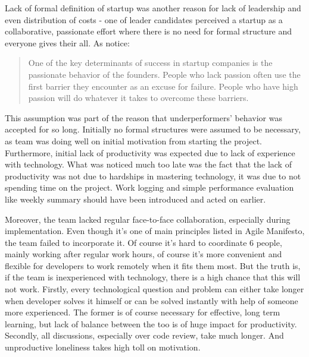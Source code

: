 \documentclass{article}
\begin{document}
Lack of formal definition of startup \citep{paternoster2014software} was another reason for lack of leadership and even distribution of costs - one of leader candidates perceived a startup as a collaborative, passionate effort where there is no need for formal structure and everyone gives their all. As \cite{giardino2014early} notice:
\begin{quote}
  One of the key determinants of success in startup companies is the passionate behavior of the founders. People who lack passion often use the first barrier they encounter as an excuse for failure. People who have high passion will do whatever it takes to overcome these barriers.
\end{quote}

This assumption was part of the reason that underperformers' behavior was accepted for so long. Initially no formal structures were assumed to be necessary, as team was doing well on initial motivation from starting the project. Furthermore, initial lack of productivity was expected due to lack of experience with technology. What was noticed much too late was the fact that the lack of productivity was not due to hardships in mastering technology, it was due to not spending time on the project. Work logging and simple performance evaluation like weekly summary should have been introduced and acted on earlier.

Moreover, the team lacked regular face-to-face collaboration, especially during implementation. Even though it's one of main principles listed in Agile Manifesto, the team failed to incorporate it. Of course it's hard to coordinate 6 people, mainly working after regular work hours, of course it's more convenient and flexible for developers to work remotely when it fits them most. But the truth is, if the team is inexperienced with technology, there is a high chance that this will not work. Firstly, every technological question and problem can either take longer when developer solves it himself or can be solved instantly with help of someone more experienced. The former is of course necessary for effective, long term learning, but lack of balance between the too is of huge impact for productivity. Secondly, all discussions, especially over code review, take much longer. And unproductive loneliness takes high toll on motivation.
\end{document}

